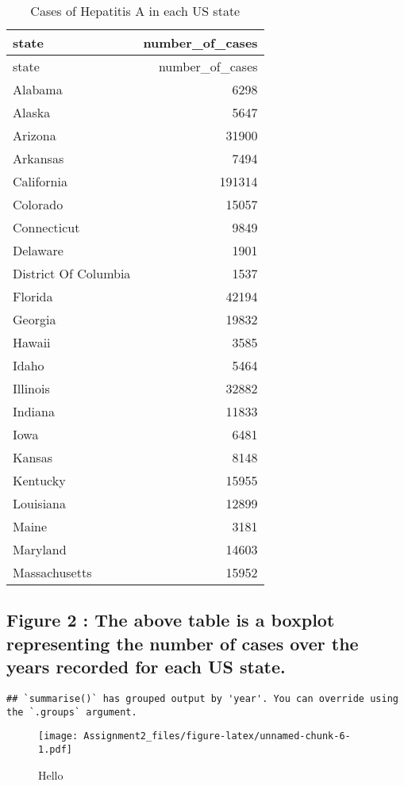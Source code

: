 \documentclass[
]{article}
\begin{document}
\begin{longtable}[]{@{}lr@{}}
\caption{Cases of Hepatitis A in each US state}\tabularnewline
\toprule
state & number\_of\_cases \\
\midrule
\endfirsthead
\toprule
state & number\_of\_cases \\
\midrule
\endhead
Alabama & 6298 \\
Alaska & 5647 \\
Arizona & 31900 \\
Arkansas & 7494 \\
California & 191314 \\
Colorado & 15057 \\
Connecticut & 9849 \\
Delaware & 1901 \\
District Of Columbia & 1537 \\
Florida & 42194 \\
Georgia & 19832 \\
Hawaii & 3585 \\
Idaho & 5464 \\
Illinois & 32882 \\
Indiana & 11833 \\
Iowa & 6481 \\
Kansas & 8148 \\
Kentucky & 15955 \\
Louisiana & 12899 \\
Maine & 3181 \\
Maryland & 14603 \\
Massachusetts & 15952 \\
\bottomrule
\end{longtable}

\hypertarget{figure-2-the-above-table-is-a-boxplot-representing-the-number-of-cases-over-the-years-recorded-for-each-us-state.}{%
\subsection{Figure 2 : The above table is a boxplot representing the
number of cases over the years recorded for each US
state.}\label{figure-2-the-above-table-is-a-boxplot-representing-the-number-of-cases-over-the-years-recorded-for-each-us-state.}}

\begin{verbatim}
## `summarise()` has grouped output by 'year'. You can override using the `.groups` argument.
\end{verbatim}

\begin{figure}
\centering
\texttt{[image: Assignment2\_files/figure-latex/unnamed-chunk-6-1.pdf]}
\caption{Hello}
\end{figure}
\end{document}

